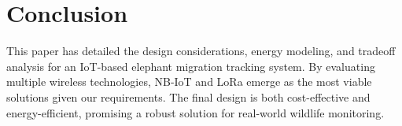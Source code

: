 \section{Conclusion}
This paper has detailed the design considerations, energy modeling, and tradeoff analysis for an IoT-based elephant migration tracking system. By evaluating multiple wireless technologies, NB-IoT and LoRa emerge as the most viable solutions given our requirements. The final design is both cost-effective and energy-efficient, promising a robust solution for real-world wildlife monitoring.
